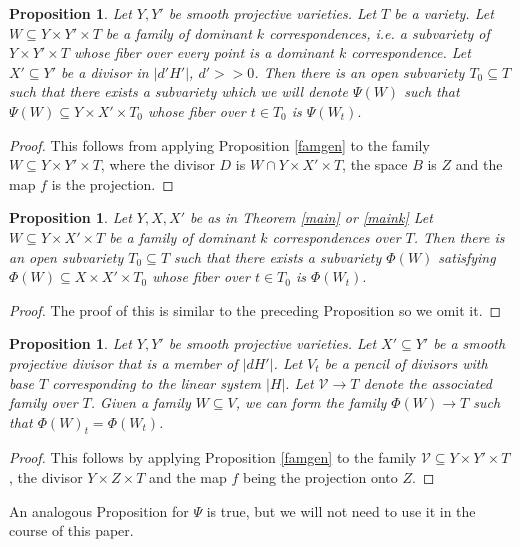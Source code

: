 \documentclass[12pt]{amsart}
\numberwithin{equation}{section}
\newtheorem{proposition}[theorem]{Proposition}
\numberwithin{theorem}{section}
\theoremstyle{definition}
\theoremstyle{definition}
\begin{document}
\begin{proposition}\label{Psifam}
    Let $Y, Y'$ be smooth projective varieties. Let $T$ be a variety. Let $W \subseteq Y \times Y' \times T$ be a family of dominant $k$ correspondences, i.e. a subvariety of $Y \times Y' \times T$ whose fiber over every point is a dominant $k$ correspondence. Let $X' \subseteq Y'$ be a divisor in $|d'H'|$, $d'>>0$. Then there is an open subvariety $T_0 \subseteq T$ such that there exists a subvariety which we will denote $\Psi(W)$ such that $ \Psi(W) \subseteq Y \times X' \times T_0$ whose fiber over $t \in T_0$ is $\Psi(W_t).$
\end{proposition}
\begin{proof}
    This follows from applying Proposition \ref{famgen} to the family $W  \subseteq Y \times Y' \times T$, where the divisor $D$ is  $W \cap Y \times X' \times T$, the space $B$  is $Z$ and the map $f$ is the projection.
\end{proof}
\begin{proposition}\label{Phifam}
    Let $Y, X, X'$ be as in Theorem \ref{main} or \ref{maink} Let $W \subseteq Y \times X' \times T$ be a family of dominant $k$ correspondences over $T$. Then there is an open subvariety $T_0 \subseteq T$ such that there exists a subvariety $\Phi(W)$ satisfying $\Phi(W) \subseteq X \times X' \times T_0$ whose fiber over $t \in T_0$ is $\Phi(W_t).$
\end{proposition}
\begin{proof}
    The proof of this is similar to the preceding Proposition so we omit it.
\end{proof}

\begin{proposition}
    Let $Y,Y'$ be smooth projective varieties. Let $X' \subseteq Y'$ be a smooth projective divisor that is a member of $ |dH'|$. Let $V_t$ be a pencil of divisors with base $T$ corresponding to the linear system $|H|.$ Let $\mathcal{V} \to T$ denote the associated family over $T$. Given a family $W \subseteq V $, we can form the family $\Phi(W) \to T$ such that $\Phi(W)_t = \Phi(W_t)$.
\end{proposition}
\begin{proof}
    This follows by applying Proposition \ref{famgen} to the family $\mathcal{V} \subseteq  Y \times Y' \times T$, the divisor $ Y \times Z \times T $ and the map $f$ being the projection onto $Z$.
\end{proof}
An analogous Proposition for $\Psi$ is true, but we will not need to use it in the course of this paper.
\end{document}
